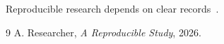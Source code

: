\documentclass{article}
\begin{document}
Reproducible research depends on clear records~\cite{example}.
\begin{thebibliography}{9}
A. Researcher, \emph{A Reproducible Study}, 2026.
\end{thebibliography}
\end{document}
